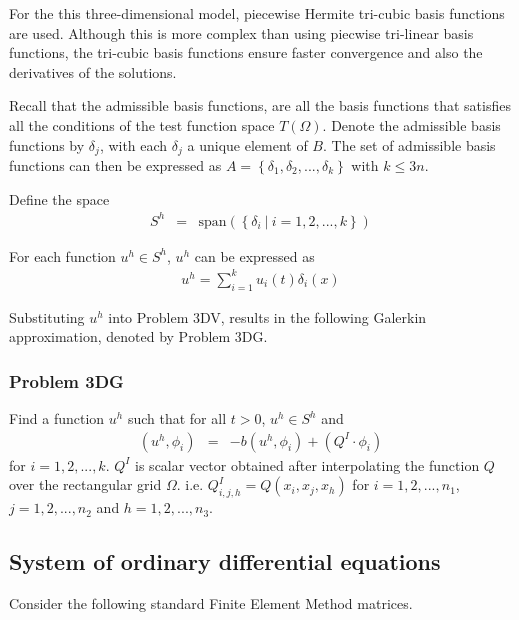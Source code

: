 For the this three-dimensional model, piecewise Hermite tri-cubic basis functions are used. Although this is more complex than using piecwise tri-linear basis functions, the tri-cubic basis functions ensure faster convergence and also the derivatives of the solutions.

Recall that the admissible basis functions, are all the basis functions that satisfies all the conditions of the test function space $T(\Omega)$. Denote the admissible basis functions by $\delta_j$, with each $\delta_j$ a unique element of $B$. The set of admissible basis functions can then be expressed as $A = \left\{\delta_1, \delta_2,... , \delta_k\right\}$ with $k \leq 3n$.

Define the space
\begin{eqnarray*}
	S^h & = & \textrm{span}\left(\left\{\delta_i \ | \ i = 1,2,...,k \right\} \right)
\end{eqnarray*}

For each function $u^h \in S^h$, $u^h$ can be expressed as
\begin{eqnarray*}
	u^h = \sum_{i = 1}^{k} u_i(t) \delta_{i}(x)
\end{eqnarray*}

Substituting $u^h$ into Problem 3DV, results in the following Galerkin approximation, denoted by Problem 3DG.

\subsubsection{Problem 3DG}
Find a function $u^h$ such that for all $t>0$, $u^h \in S^h$ and
\begin{eqnarray*}
	(u^h, \phi_i) & = & -b(u^h,\phi_i) + (Q^I \cdot \phi_i)
\end{eqnarray*} for $i = 1,2,...,k$. $Q^I$ is scalar vector obtained after interpolating the function $Q$ over the rectangular grid $\Omega$. i.e. $Q^I_{i,j, h} = Q(x_i,x_j, x_h)$ for $i = 1,2,...,n_1$, $j = 1,2,...,n_2$ and $h = 1,2,...,n_3$.

\subsection{System of ordinary differential equations}\label{3d_fem_g}
Consider the following standard Finite Element Method matrices.

